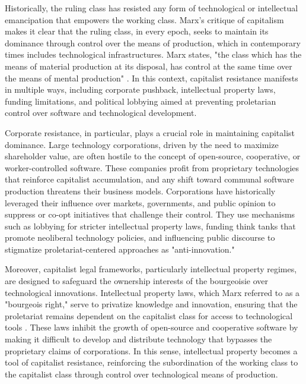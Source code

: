 \begin{refsection}
Historically, the ruling class has resisted any form of technological or intellectual emancipation that empowers the working class. Marx’s critique of capitalism makes it clear that the ruling class, in every epoch, seeks to maintain its dominance through control over the means of production, which in contemporary times includes technological infrastructures. Marx states, "the class which has the means of material production at its disposal, has control at the same time over the means of mental production" \cite[pp.~64]{marx_german_ideology}. In this context, capitalist resistance manifests in multiple ways, including corporate pushback, intellectual property laws, funding limitations, and political lobbying aimed at preventing proletarian control over software and technological development.

Corporate resistance, in particular, plays a crucial role in maintaining capitalist dominance. Large technology corporations, driven by the need to maximize shareholder value, are often hostile to the concept of open-source, cooperative, or worker-controlled software. These companies profit from proprietary technologies that reinforce capitalist accumulation, and any shift toward communal software production threatens their business models. Corporations have historically leveraged their influence over markets, governments, and public opinion to suppress or co-opt initiatives that challenge their control. They use mechanisms such as lobbying for stricter intellectual property laws, funding think tanks that promote neoliberal technology policies, and influencing public discourse to stigmatize proletariat-centered approaches as "anti-innovation."

Moreover, capitalist legal frameworks, particularly intellectual property regimes, are designed to safeguard the ownership interests of the bourgeoisie over technological innovations. Intellectual property laws, which Marx referred to as a "bourgeois right," serve to privatize knowledge and innovation, ensuring that the proletariat remains dependent on the capitalist class for access to technological tools \cite[pp.~244]{marx_critique_gotha}. These laws inhibit the growth of open-source and cooperative software by making it difficult to develop and distribute technology that bypasses the proprietary claims of corporations. In this sense, intellectual property becomes a tool of capitalist resistance, reinforcing the subordination of the working class to the capitalist class through control over technological means of production.


\end{refsection}
